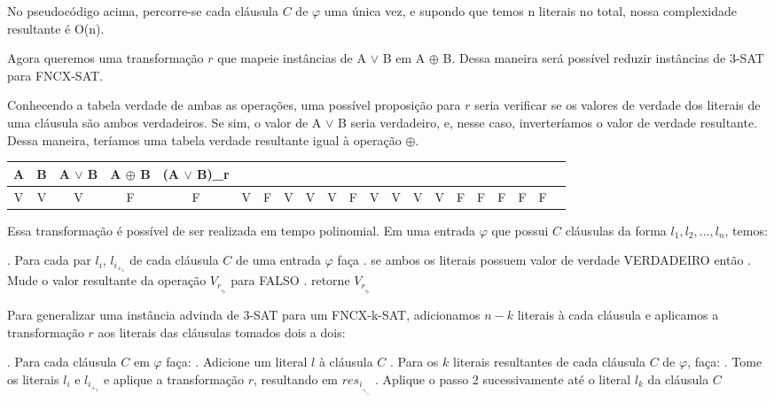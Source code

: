 \documentclass[12pt]{article}
\begin{document}
\begin{enumerate}
{  No pseudocódigo acima, percorre-se cada cláusula $C$ de $\varphi$ uma única vez, e supondo que temos n literais no total, nossa complexidade resultante é O(n).
  
  Agora queremos uma transformação $r$ que mapeie instâncias de A $\vee$ B em A $\oplus$ B. Dessa maneira será possível reduzir instâncias de 3-SAT para FNCX-SAT.
  
  Conhecendo a tabela verdade de ambas as operações, uma possível proposição para $r$ seria verificar se os valores de verdade dos literais de uma cláusula são ambos verdadeiros. Se sim, o valor de A $\vee$ B seria verdadeiro, e, nesse caso, inverteríamos o valor de verdade resultante. Dessa maneira, teríamos uma tabela verdade resultante igual à operação $\oplus$.
  
  \begin{center}
  \begin{tabular}{|c|c|c|c|c|} \hline
      A & B & A $\vee$ B & A $\oplus$ B & (A $\vee$ B)_r\\ \hline
      V & V & V & F & F & \hline
      V & F & V & V & V & \hline
      F & V & V & V & V & \hline
      F & F & F & F & F & \hline
  \end{tabular}
  \end{center}
  
  Essa transformação é possível de ser realizada em tempo polinomial. Em uma entrada $\varphi$ que possui $C$ cláusulas da forma $l_1, l_2, ..., l_n$, temos:
  \begin{itemize}
      . Para cada par $l_i$, $l_i_+_1$ de cada cláusula $C$ de uma entrada $\varphi$ faça      \newline
      . \quad se ambos os literais possuem valor de verdade VERDADEIRO então      \newline
      . \quad \quad \quad Mude o valor resultante da operação $V_r__o_p$ para FALSO      \newline
      . retorne $V_r__o_p$ 
  \end{itemize}
  
  Para generalizar uma instância advinda de 3-SAT para um FNCX-k-SAT, adicionamos $n-k$ literais à cada cláusula e aplicamos a transformação $r$ aos literais das cláusulas tomados dois a dois:
  
  \begin{itemize}
      . Para cada cláusula $C$ em $\varphi$ faça: \newline
      . \quad Adicione um literal $l$ à cláusula $C$ \newline
      . Para os $k$ literais resultantes de cada cláusula $C$ de $\varphi$, faça: \newline
      . \quad Tome os literais $l_i$ e $l_i_+_1$ e aplique a transformação $r$, resultando em $res_i_,_i_+_1$ \newline
      . \quad Aplique o passo 2 sucessivamente até o literal $l_k$ da cláusula $C$
  \end{itemize}
  
}
\end{enumerate}
\end{document}
